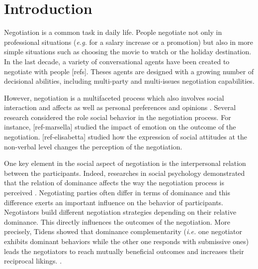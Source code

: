 \documentclass[sigconf]{aamas}  %
\begin{document}
	
	
	\maketitle
	
	
	
	\section{Introduction}
	Negotiation is a common task in daily life. People negotiate not only in professional situations (\emph{e.g.} for a salary increase or a promotion) but also in more simple situations such as choosing the movie to watch or the holiday destination. In the last decade, a variety of conversational agents have been created to negotiate with people [refs]. Theses agents are designed with a growing number of decisional abilities, including multi-party and multi-issues negotiation capabilities.
	
	However, negotiation is a multifaceted process which also involves social interaction and affects as well as personal preferences and opinions  \cite{bro2010affective}. Several research considered the role social behavior in the negotiation process. For instance, [ref-marsella] studied the impact of emotion on the outcome of the negotiation. [ref-elisabetta] studied how the expression of social attitudes at the non-verbal level changes the perception of the negotiation.
	
	One key element in the social aspect of negotiation is the interpersonal relation between the participants. Indeed, researches in social psychology demonstrated that the relation of dominance affects the way the negotiation process is perceived \cite{van2006power}. Negotiating parties often differ in terms of dominance and this difference exerts an important influence on the behavior of participants. Negotiators build different negotiation strategies depending on their relative dominance. This directly influences the outcomes of the negotiation. More precisely, Tidens \cite{tiedens2003power} showed that dominance complementarity (\emph{i.e.} one negotiator exhibits dominant behaviors while the other one responds with submissive ones) leads the negotiators to reach mutually beneficial outcomes and increases their reciprocal likings. \cite{wiltermuth2015benefits,tiedens2003power}.
	
\end{document}
